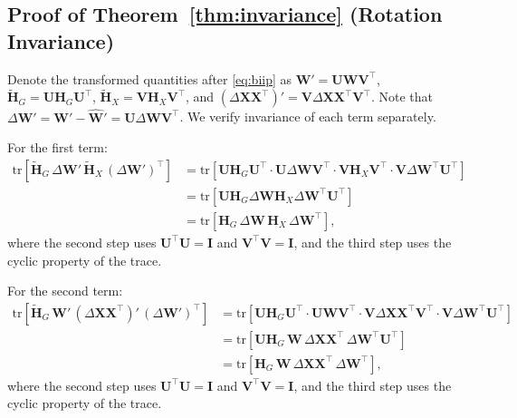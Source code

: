 \documentclass{article} %
\begin{document}
\subsection{Proof of Theorem~\ref{thm:invariance} (Rotation Invariance)}
\label{proof:theorem1}
Denote the transformed quantities after \eqref{eq:biip} as
$\mathbf{W}' = \mathbf{U}\mathbf{W}\mathbf{V}^\top$,
$\widetilde{\mathbf{H}}_G = \mathbf{U}\mathbf{H}_G\mathbf{U}^\top$,
$\widetilde{\mathbf{H}}_X = \mathbf{V}\mathbf{H}_X\mathbf{V}^\top$, and
$(\Delta\mathbf{X}\mathbf{X}^\top)' = \mathbf{V}\Delta\mathbf{X}\mathbf{X}^\top\mathbf{V}^\top$.
Note that $\Delta\mathbf{W}' = \mathbf{W}' - \widehat{\mathbf{W}}' = \mathbf{U}\Delta\mathbf{W}\mathbf{V}^\top$.
We verify invariance of each term separately.

For the first term:
\begin{align}
    \mathrm{tr}\!\left[\widetilde{\mathbf{H}}_G\,\Delta\mathbf{W}'\,
    \widetilde{\mathbf{H}}_X\,(\Delta\mathbf{W}')^\top\right]
    &= \mathrm{tr}\!\left[
        \mathbf{U}\mathbf{H}_G\mathbf{U}^\top \cdot \mathbf{U}\Delta\mathbf{W}\mathbf{V}^\top
        \cdot \mathbf{V}\mathbf{H}_X\mathbf{V}^\top \cdot \mathbf{V}\Delta\mathbf{W}^\top\mathbf{U}^\top
    \right] \nonumber \\
    &= \mathrm{tr}\!\left[
        \mathbf{U}\mathbf{H}_G\Delta\mathbf{W}\mathbf{H}_X\Delta\mathbf{W}^\top\mathbf{U}^\top
    \right] \nonumber \\
    &= \mathrm{tr}\!\left[\mathbf{H}_G\,\Delta\mathbf{W}\,\mathbf{H}_X\,\Delta\mathbf{W}^\top\right],
\end{align}
where the second step uses $\mathbf{U}^\top\mathbf{U} = \mathbf{I}$ and
$\mathbf{V}^\top\mathbf{V} = \mathbf{I}$, and the third step uses the
cyclic property of the trace.

For the second term:
\begin{align}
    \mathrm{tr}\!\left[\widetilde{\mathbf{H}}_G\,\mathbf{W}'\,
    (\Delta\mathbf{X}\mathbf{X}^\top)'\,(\Delta\mathbf{W}')^\top\right]
    &= \mathrm{tr}\!\left[
        \mathbf{U}\mathbf{H}_G\mathbf{U}^\top \cdot \mathbf{U}\mathbf{W}\mathbf{V}^\top
        \cdot \mathbf{V}\Delta\mathbf{X}\mathbf{X}^\top\mathbf{V}^\top
        \cdot \mathbf{V}\Delta\mathbf{W}^\top\mathbf{U}^\top
    \right] \nonumber \\
    &= \mathrm{tr}\!\left[
        \mathbf{U}\mathbf{H}_G\,\mathbf{W}\,\Delta\mathbf{X}\mathbf{X}^\top\,
        \Delta\mathbf{W}^\top\mathbf{U}^\top
    \right] \nonumber \\
    &= \mathrm{tr}\!\left[\mathbf{H}_G\,\mathbf{W}\,\Delta\mathbf{X}\mathbf{X}^\top\,
    \Delta\mathbf{W}^\top\right],
\end{align}
where the second step uses $\mathbf{U}^\top\mathbf{U} = \mathbf{I}$ and
$\mathbf{V}^\top\mathbf{V} = \mathbf{I}$, and the third step uses the
cyclic property of the trace.
\end{document}

